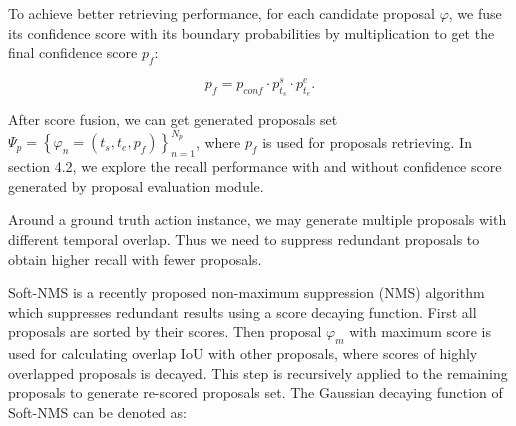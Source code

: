 \documentclass[runningheads]{llncs}
\begin{document}
To achieve better retrieving performance, for each candidate proposal $\varphi$,  we fuse its confidence score with its boundary probabilities by multiplication to get the final confidence score $p_{f}$:

\begin{equation}
p_{f}=p_{conf} \cdot p^s_{t_s} \cdot p^e_{t_e} .
\end{equation}

After score fusion, we can get generated proposals set $\Psi_p  = \left \{ \varphi  _n=(t_s,t_e,p_{f}  ) \right \}_{n=1}^{N_p}$, where $p_{f}$ is used for proposals retrieving. In section 4.2, we explore the recall performance with and without confidence score generated by proposal evaluation module.

Around a ground truth action instance, we may generate multiple proposals with different temporal overlap. Thus we need to suppress redundant proposals to obtain higher recall with fewer proposals.

Soft-NMS \cite{softNMS} is a recently proposed non-maximum suppression (NMS) algorithm which suppresses redundant results using a score decaying function. First all proposals are sorted by their scores. Then proposal $\varphi_m$ with maximum score is used for calculating overlap IoU with other proposals, where scores of highly overlapped proposals is decayed. This step is recursively applied to the remaining proposals to  generate re-scored proposals set.
The Gaussian decaying function of Soft-NMS can be denoted  as:
\end{document}

